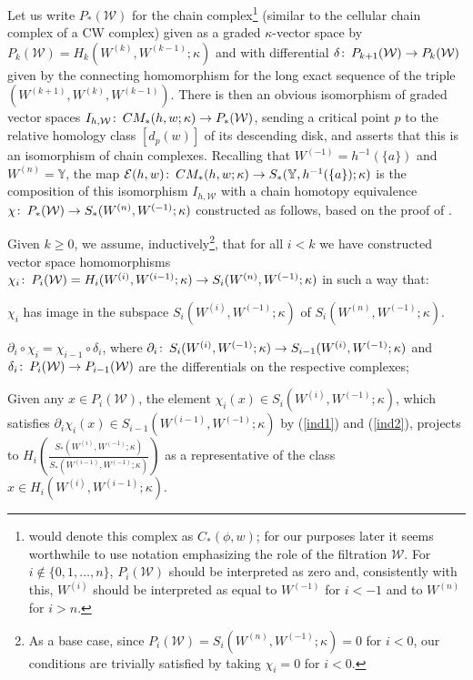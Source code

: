 \documentclass[11pt]{amsart}
\makeatletter
\def\namedlabel#1#2{\begingroup
	#2%
	\def\@currentlabel{#2}%
	\phantomsection\label{#1}\endgroup
}
\theoremstyle{definition}
\theoremstyle{remark}
\numberwithin{equation}{section}
\def\co{\colon\thinspace}
\makeatother
\begin{document}
Let us write $P_*(\mathcal{W})$ for the chain complex\footnote{\cite{Paj} would denote this complex as $C_*(\phi,w)$; for our purposes later it seems worthwhile to use notation emphasizing the role of the filtration $\mathcal{W}$.  For $i\notin \{0,1,\ldots,n\}$, $P_i(\mathcal{W})$ should be interpreted as zero and, consistently with this,  $W^{(i)}$ should be interpreted as equal to $W^{(-1)}$ for $i<-1$ and to $W^{(n)}$ for $i>n$.} (similar to the cellular chain complex of a CW complex) given as a graded $\kappa$-vector space by $P_k(\mathcal{W})=H_k(W^{(k)},W^{(k-1)};\kappa)$ and with differential $\delta\co P_{k+1}(\mathcal{W})\to P_k(\mathcal{W})$ given by the connecting homomorphism for the long exact sequence of the triple $(W^{(k+1)},W^{(k)},W^{(k-1)})$.   There is then an obvious isomorphism of graded vector spaces $I_{h,\mathcal{W}}\co CM_*(h,w;\kappa)\to P_*(\mathcal{W})$, sending a critical point $p$ to the relative homology class $[d_p(w)]$ of its descending disk, and \cite[Proposition 6.1.8]{Paj} asserts that this is an isomorphism of chain complexes.  Recalling that $W^{(-1)}=h^{-1}(\{a\})$ and $W^{(n)}=\mathbb{Y}$,  the map $\mathcal{E}(h,w)\co CM_*(h,w;\kappa)\to S_*(\mathbb{Y},h^{-1}(\{a\});\kappa)$ is the composition of this isomorphism $I_{h,\mathcal{W}}$ with a chain homotopy equivalence $\chi\co P_*(\mathcal{W})\to S_*(W^{(n)},W^{(-1)};\kappa)$ constructed  as follows, based on the proof of \cite[Theorem 6.3.6]{Paj}.

Given $k\geq 0$, we assume, inductively\footnote{As a base case, since $P_{i}(\mathcal{W})=S_i(W^{(n)},W^{(-1)};\kappa)=0$ for $i<0$, our conditions are trivially satisfied by taking $\chi_i=0$ for $i<0$.}, that for all $i<k$ we have constructed vector space homomorphisms $\chi_i\co P_i(\mathcal{W})=H_i(W^{(i)},W^{(i-1)};\kappa)\to S_i(W^{(n)},W^{(-1)};\kappa)$ in such a way that: 
\begin{description}[style=multiline, labelwidth=1.5cm]
	\item[\namedlabel{ind1}{($\chi.1$)}]  $\chi_i$ has image in the subspace $S_i(W^{(i)},W^{(-1)};\kappa)$ of $S_i(W^{(n)},W^{(-1)};\kappa)$.
	\item[\namedlabel{ind2}{($\chi.2$)}] $\partial_i\circ\chi_i=\chi_{i-1}\circ\delta_{i}$, where $\partial_i\co S_i(W^{(i)},W^{(-1)};\kappa)\to S_{i-1}(W^{{(i)}},W^{(-1)};\kappa)$ and $\delta_{i}\co P_{i}(\mathcal{W})\to P_{i-1}(\mathcal{W})$ are the differentials on the respective complexes;
	\item[\namedlabel{ind3}{($\chi.3$)}] Given any $x\in P_i(\mathcal{W})$, the element $\chi_i(x)\in S_i(W^{(i)},W^{(-1)};\kappa)$, which satisfies $\partial_i\chi_i(x)\in S_{i-1}(W^{(i-1)},W^{(-1)};\kappa)$ by (\ref{ind1}) and (\ref{ind2}), projects to $H_i\left(\frac{S_*(W^{(i)},W^{(-1)};\kappa)}{S_*(W^{(i-1)},W^{(-1)};\kappa)}\right)$ as a representative of the class $x\in H_i(W^{(i)},W^{(i-1)};\kappa)$. 
\end{description}
\end{document}
